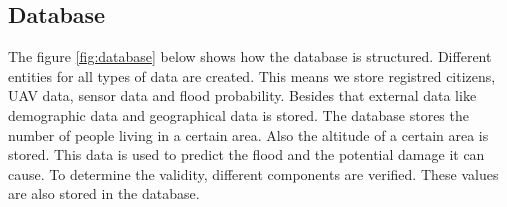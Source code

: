 \subsection{Database}
\label{subsec:databaseview}
The figure \ref{fig:database} below shows how the database is structured. Different entities for all types of data are created. This means we store registred citizens, UAV data, sensor data and flood probability. Besides that external data like demographic data and geographical data is stored. The database stores the number of people living in a certain area. Also the altitude of a certain area is stored. This data is used to predict the flood and the potential damage it can cause. To determine the validity, different components are verified. These values are also stored in the database. 

\clearpage





